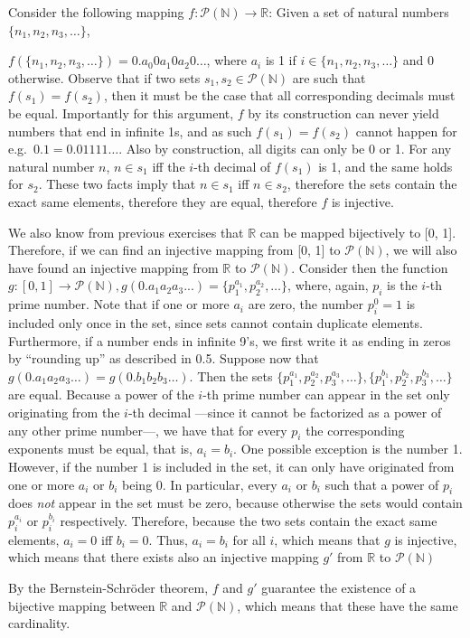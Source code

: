 \begin{solution}

    Consider the following mapping $f:\mathcal{P}(\mathbb{N}) \rightarrow \mathbb{R}$: Given a set of natural numbers $\{n_1, n_2, n_3, \ldots\}$, 
    
    $f(\{n_1, n_2, n_3, \ldots \}) = 0.a_0 0 a_1 0 a_2 0 \ldots$, where $a_i$ is 1 if $i \in \{n_1, n_2, n_3, \ldots\}$ and 0 otherwise. Observe that if two sets $s_1, s_2 \in \mathcal{P}(\mathbb{N})$ are such that $f(s_1) = f(s_2)$, then it must be the case that all corresponding decimals must be equal. Importantly for this argument, $f$ by its construction can never yield numbers that end in infinite 1s, and as such $f(s_1) = f(s_2)$ cannot happen for e.g.\ $0.1 = 0.01111\ldots$. Also by construction, all digits can only be 0 or 1. For any natural number $n$, $n \in s_1$ iff the $i$-th decimal of $f(s_1)$ is 1, and the same holds for $s_2$. These two facts imply that $n \in s_1$ iff $n \in s_2$, therefore the sets contain the exact same elements, therefore they are equal, therefore $f$ is injective.

    We also know from previous exercises that $\mathbb{R}$ can be mapped bijectively to [0, 1]. Therefore, if we can find an injective mapping from [0, 1] to $\mathcal{P}(\mathbb{N})$, we will also have found an injective mapping from $\mathbb{R}$ to $\mathcal{P}(\mathbb{N})$. Consider then the function $g:[0, 1] \rightarrow \mathcal{P}(\mathbb{N}), g(0.a_1 a_2 a_3 ...) = \{p_1^{a_1}, p_2^{a_2}, \ldots\}$, where, again, $p_i$ is the $i$-th prime number. Note that if one or more $a_i$ are zero, the number $p_i^0 = 1$ is included only once in the set, since sets cannot contain duplicate elements. Furthermore, if a number ends in infinite 9's, we first write it as ending in zeros by ``rounding up'' as described in 0.5. Suppose now that $g(0.a_1 a_2 a_3 \ldots) = g(0.b_1 b_2 b_3 \ldots)$. Then the sets $\{p_1^{a_1}, p_2^{a_2}, p_3^{a_3}, \ldots\}, \{p_1^{b_1}, p_2^{b_2}, p_3^{b_3}, \ldots \}$ are equal. Because a power of the $i$-th prime number can appear in the set only originating from the $i$-th decimal ---since it cannot be factorized as a power of any other prime number---, we have that for every $p_i$ the corresponding exponents must be equal, that is, $a_i = b_i$. One possible exception is the number 1. However, if the number 1 is included in the set, it can only have originated from one or more $a_i$ or $b_i$ being 0. In particular, every $a_i$ or $b_i$ such that a power of $p_i$ does \textit{not} appear in the set must be zero, because otherwise the sets would contain $p_i^{a_i}$ or $p_i^{b_i}$ respectively. Therefore, because the two sets contain the exact same elements, $a_i = 0$ iff $b_i = 0$. Thus, $a_i = b_i$ for all $i$, which means that $g$ is injective, which means that there exists also an injective mapping $g'$ from $\mathbb{R}$ to $\mathcal{P}(\mathbb{N})$

    By the Bernstein-Schröder theorem, $f$ and $g'$ guarantee the existence of a bijective mapping between $\mathbb{R}$ and $\mathcal{P}(\mathbb{N})$, which means that these have the same cardinality.
\end{solution}

